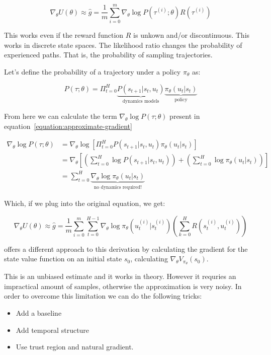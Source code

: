 \documentclass{../main.tex}{subfiles}
\begin{document}
\begin{equation}\label{equation:approximate-gradient-vanilla}
\nabla_{\theta}U(\theta) \approx \hat{g} = \frac{1}{m} \sum_{i = 0}^{m} \nabla_{\theta} \log P(\tau^{(i)} ; \theta) R(\tau^{(i)})
\end{equation}

This works even if the reward function $R$ is unkown and/or discontinuous. This works in discrete state spaces. The likelihood ratio changes the probability of experienced paths. That is, the probability of sampling trajectories.

Let's define the probability of a trajectory under a policy $\pi_{\theta}$ as: 

\begin{equation}
P (\tau; \theta) = \Pi_{t=0}^{H} \underbrace{P (s_{t+1} | s_t, u_t)}_\textrm{dynamics models} \underbrace{\pi_{\theta} (u_t | s_t)}_\textrm{policy}
\end{equation}

From here we can calculate the term $\nabla_{\theta} \log P(\tau ; \theta)$ present in equation~\ref{equation:approximate-gradient}

\begin{equation}
\begin{aligned}
\nabla_{\theta} \log P(\tau ; \theta) & = \nabla_{\theta} \log [\Pi_{t=0}^{H} P(s_{t+1} | s_t, u_t) \pi_{\theta}(u_t | s_t)] \\
 & = \nabla_{\theta} [(\sum_{t=0}^{H} \log P(s_{t+1} | s_t, u_t)) + (\sum_{t=0}^{H} \log \pi_{\theta}(u_t | s_t))] \\ 
 & = \sum_{t=0}^{H} \underbrace{\nabla_{\theta} \log \pi_{\theta}(u_t | s_t)}_\textrm{no dynamics required!}
\end{aligned}
\end{equation}

Which, if we plug into the original equation, we get:

\begin{equation}
\nabla_{\theta}U(\theta) \approx \hat{g} = \frac{1}{m} \sum_{i = 0}^{m} \sum_{t=0}^{H-1} \nabla_{\theta} \log \pi_{\theta}(u_t^{(i)} | s_t^{(i)}) (\sum_{k=0}^{H}R(s_t^{(i)}, u_t^{(i)}))
\end{equation}

\cite{Sutton1999} offers a different approach to this derivation by calculating the gradient for the state value function on an initial state $s_0$, calculating $\nabla_{\theta} V_{\pi_{\theta}}(s_0)$.

This is an unbiased estimate and it works in theory. However it requries an impractical amount of samples, otherwise the approximation is very noisy. In order to overcome this limitation we can do the following tricks:
\begin{itemize}
\item Add a baseline
\item Add temporal structure
\item Use trust region and natural gradient.
\end{itemize}
\end{document}
